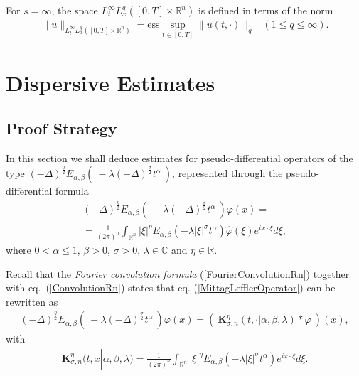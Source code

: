\documentclass{amsart}
\theoremstyle{definition}
\theoremstyle{remark}
\numberwithin{equation}{section}
\newcommand{\BR}{{\mathbb R}}
\begin{document}
For $s=\infty$, the space $L^\infty_t L^q_x([0,T]\times \BR^n)$ is defined in terms of the norm
\begin{eqnarray}
	\label{mixedNormSup}\| u\|_{L^\infty_t L^q_x([0,T]\times \BR^n)}=\mbox{ess}\sup_{t\in [0,T]}\|u(t,\cdot)\|_q & (1\leq q\leq \infty).
\end{eqnarray}

\section{Dispersive Estimates}\label{DispersiveSection}


\subsection{Proof Strategy}\label{ProofStrategy}

In this section we shall deduce estimates for pseudo-differential operators of the type $\displaystyle (-\Delta)^{\frac{\eta}{2}}E_{\alpha,\beta}\left(~-\lambda(-\Delta)^{\frac{\sigma}{2}} t^\alpha~\right)$, represented through the pseudo-differential formula
\begin{eqnarray}
	\label{MittagLefflerOperator}
	\displaystyle	(-\Delta)^{\frac{\eta}{2}}E_{\alpha,\beta}\left(~-\lambda(-\Delta)^{\frac{\sigma}{2}} t^\alpha~\right)\varphi(x)=  \nonumber \\
	=\frac{1}{(2\pi)^n}\int_{\mathbb{R}^n}|\xi|^\eta E_{\alpha,\beta}(-\lambda|\xi|^\sigma t^\alpha)\widehat{\varphi}(\xi)e^{ix \cdot \xi}d\xi,
\end{eqnarray}
where $0< \alpha\leq 1$, $\beta>0$, $\sigma>0$, $\lambda \in \mathbb{C}$ and $\eta\in \mathbb{R}$.


Recall that the {\it Fourier convolution formula} (\ref{FourierConvolutionRn}) together with eq.~(\ref{ConvolutionRn}) states that eq. (\ref{MittagLefflerOperator}) can be rewritten as
\begin{eqnarray}
	\label{MittagLefflerConvolution}
	(-\Delta)^{\frac{\eta}{2}}E_{\alpha,\beta}\left(~-\lambda(-\Delta)^{\frac{\sigma}{2}} t^\alpha~\right)\varphi(x)=\displaystyle \left(~{\bm K}_{\sigma,n}^{\eta}(t,\cdot|\alpha,\beta,\lambda)\ast \varphi~\right)(x),
\end{eqnarray}
with \begin{eqnarray}
	\label{MittagLefflerKernel}
	{\bm K}_{\sigma,n}^{\eta}(t,x|\alpha,\beta,\lambda)=
	\frac{1}{(2\pi)^n}\int_{\mathbb{R}^n}|\xi|^\eta E_{\alpha,\beta}(-\lambda|\xi|^\sigma t^\alpha)e^{ix \cdot \xi}d\xi.
\end{eqnarray}
\end{document}
